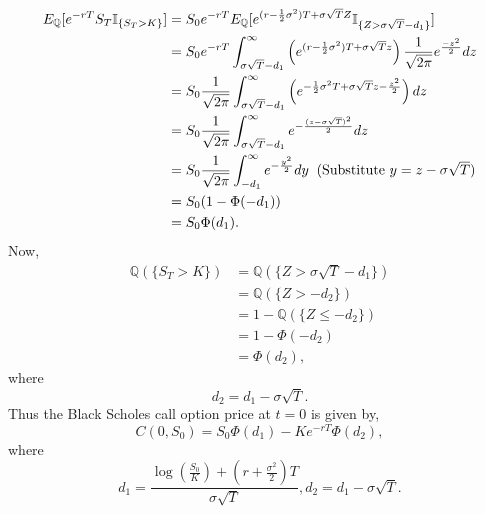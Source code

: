\documentclass[12pt]{report}
\begin{document}
\begin{align*}
    E_{\mathbb{Q}}[e^{-rT} S_{T} \mathbb{I}_{\{S_{T} > K\}}] & = S_0 e^{-rT} E_{\mathbb{Q}}[e^{(r -\frac{1}{2}\sigma^2)T + \sigma \sqrt{T}Z} \mathbb{I}_{\{Z > \sigma\sqrt{T}-d_1 \}}] \\ 
    & = S_0 e^{-rT} \int_{\sigma \sqrt{T}-d_1}^{\infty} \left( e^{(r -\frac{1}{2}\sigma^2)T + \sigma \sqrt{T}z} \right) \frac{1}{\sqrt{2 \pi}} e^{\frac{- z^{2}}{2}} dz\\
    & = S_0 \frac{1}{\sqrt{2 \pi}} \int_{\sigma \sqrt{T}-d_1}^{\infty} \left( e^{-\frac{1}{2}\sigma^2T + \sigma \sqrt{T}z - \frac{ z^{2}}{2}}\right) dz\\
    & =  S_0 \frac{1}{\sqrt{2 \pi}} \int_{\sigma \sqrt{T}-d_1}^{\infty} e^{-\frac{(z- \sigma \sqrt{T})^{2}}{2}} dz\\
    & =  S_0 \frac{1}{\sqrt{2 \pi}} \int_{ -d_1}^{\infty} e^{-\frac{y^{2}}{2}} dy \;\; \mbox{(Substitute $ y = z - \sigma \sqrt{T})$}\\
    & = S_0 (1 - \Phi(-d_1))\\
    & = S_0 \Phi(d_1).
\end{align*}
Now,
\begin{align*}
    \mathbb{Q}(\{S_{T} > K\}) &= \mathbb{Q}(\{Z > \sigma \sqrt{T} - d_1\})\\
    & = \mathbb{Q}(\{Z > -d_2\}) \\
    & = 1 - \mathbb{Q}(\{Z \leq -d_2\})\\
    & = 1 -  \Phi(-d_2)\\
    & = \Phi(d_2),
\end{align*}
where $$ d_2 = d_1 - \sigma \sqrt{T}.$$
Thus the Black Scholes call option price at $t=0$ is given by,\\
\begin{equation}
    C(0,S_0) = S_0 \Phi(d_1) - K e^{-rT} \Phi(d_2),
\label{bs_call_price}    
\end{equation}
where 
\begin{equation}
d_1 = \frac{\log(\frac{S_{0}}{K}) + (r+\frac{\sigma^{2}}{2})T}{\sigma \sqrt{T}}, d_2 = d_1 - \sigma \sqrt{T}.
\label{d_1}
\end{equation}
\end{document}
